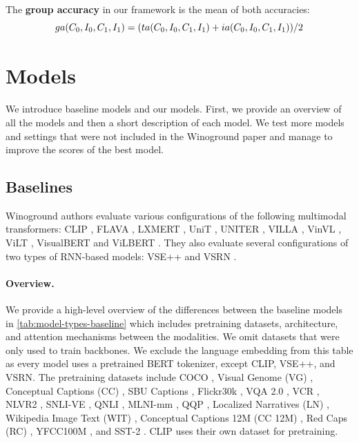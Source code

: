 The \textbf{group accuracy} in our framework is the mean of both accuracies:
\begin{equation}\label{eq:group-accuracy}
        ga(C_{0},I_{0},C_{1},I_{1})= 
        (ta(C_{0},I_{0},C_{1},I_{1}) + ia(C_{0},I_{0},C_{1},I_{1})) / 2\\
\end{equation}

\section{Models} \label{sec:winoground_models}

We introduce baseline models and our models. First, we provide an overview of all the models and then a short description of each model. We test more models and settings that were not included in the Winoground paper and manage to improve the scores of the best model.

\subsection{Baselines}
Winoground authors \cite{thrush2022winoground} evaluate various configurations of the following multimodal transformers: CLIP \cite{radford2021clip}, FLAVA \cite{singh2022flava}, LXMERT \cite{tan2020lxmert}, UniT \cite{hu2021unit}, UNITER \cite{chen2020uniter}, VILLA \cite{gan2020villa}, VinVL \cite{zhang2021vinvl}, ViLT \cite{kim2021vilt}, VisualBERT \cite{li2019visualbert} and ViLBERT \cite{lu2019vilbert}. They also evaluate several configurations of two types of RNN-based models: VSE++ \cite{faghri2018vse} and VSRN \cite{li2019vsrn}.

\paragraph{Overview.}
We provide a high-level overview of the differences between the baseline models in \cref{tab:model-types-baseline} which includes pretraining datasets, architecture, and attention mechanisms between the modalities. We omit datasets that were only used to train backbones. We exclude the language embedding from this table as every model uses a pretrained BERT tokenizer, except CLIP, VSE++, and VSRN. The pretraining datasets include COCO \cite{lin2014microsoft}, Visual Genome (VG) \cite{krishna2016visual}, Conceptual Captions (CC) \cite{sharma2018conceptual}, SBU Captions \cite{ordonez2011im2text}, Flickr30k \cite{young2014image}, VQA 2.0 \cite{goyal2017making}, VCR \cite{zellers2019recognition}, NLVR2 \cite{suhr2017corpus}, SNLI-VE \cite{xie2018visual}, QNLI \cite{rajpurkar2016squad}, MLNI-mm \cite{williams2017broad}, QQP \cite{QQPDataset}, Localized Narratives (LN) \cite{pont-tuset2020localized-narratives}, Wikipedia Image Text (WIT) \cite{srinivasan2021wit}, Conceptual Captions 12M (CC 12M) \cite{changpinyo2021conceptual12m}, Red Caps (RC) \cite{desai2021redcaps}, YFCC100M \cite{thomee2016yfcc100m}, and SST-2 \cite{Socher2013RecursiveDM}. CLIP uses their own dataset for pretraining.


